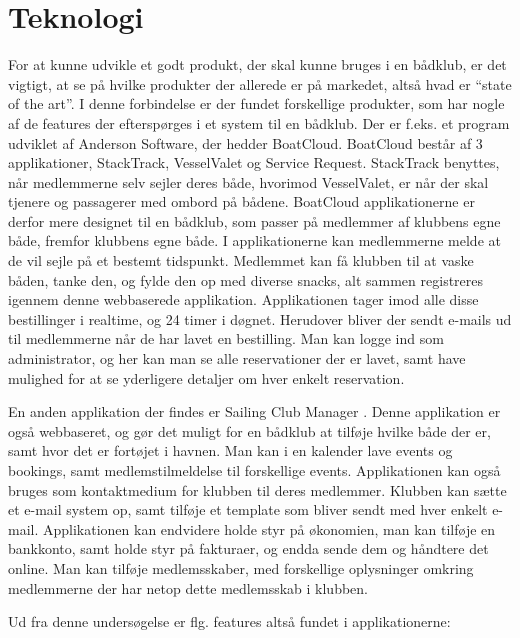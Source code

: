 \chapter{Teknologi}\label{chap:teknologi-analyse}



For at kunne udvikle et godt produkt, der skal kunne bruges i en bådklub, er det vigtigt, at se på hvilke
produkter der allerede er på markedet, altså hvad er ``state of the art''. I denne forbindelse er der fundet
forskellige produkter, som har nogle af de features der efterspørges i et system til en bådklub. Der er f.eks.
et program udviklet af Anderson Software, der hedder BoatCloud.\citep{BoatCloud} BoatCloud består af 3
applikationer, StackTrack, VesselValet og Service Request. StackTrack benyttes, når medlemmerne selv sejler
deres både, hvorimod VesselValet, er når der skal tjenere og passagerer med ombord på bådene. BoatCloud
applikationerne er derfor mere designet til en bådklub, som passer på medlemmer af klubbens egne både, fremfor
klubbens egne både. I applikationerne kan medlemmerne melde at de vil sejle på et bestemt tidspunkt. Medlemmet
kan få klubben til at vaske båden, tanke den, og fylde den op med diverse snacks, alt sammen registreres
igennem denne webbaserede applikation. Applikationen tager imod alle disse bestillinger i realtime, og 24
timer i døgnet. Herudover bliver der sendt e-mails ud til medlemmerne når de har lavet en bestilling. Man kan
logge ind som administrator, og her kan man se alle reservationer der er lavet, samt have mulighed for at
se yderligere detaljer om hver enkelt reservation.

En anden applikation der findes er Sailing Club Manager \citep{SailClub}. Denne applikation er også
webbaseret, og gør det muligt for en bådklub at tilføje hvilke både der er, samt hvor det er fortøjet i
havnen. Man kan i en kalender lave events og bookings, samt medlemstilmeldelse til forskellige events. Applikationen kan også bruges som kontaktmedium for klubben til deres medlemmer. Klubben kan sætte et
e-mail system op, samt tilføje et template som bliver sendt med hver enkelt e-mail. Applikationen kan endvidere
holde styr på økonomien, man kan tilføje en bankkonto, samt  holde styr på fakturaer, og endda sende
dem og håndtere det online. Man kan tilføje medlemsskaber, med forskellige oplysninger omkring medlemmerne der
har netop dette medlemsskab i klubben.

Ud fra denne undersøgelse er flg. features altså fundet i applikationerne:

